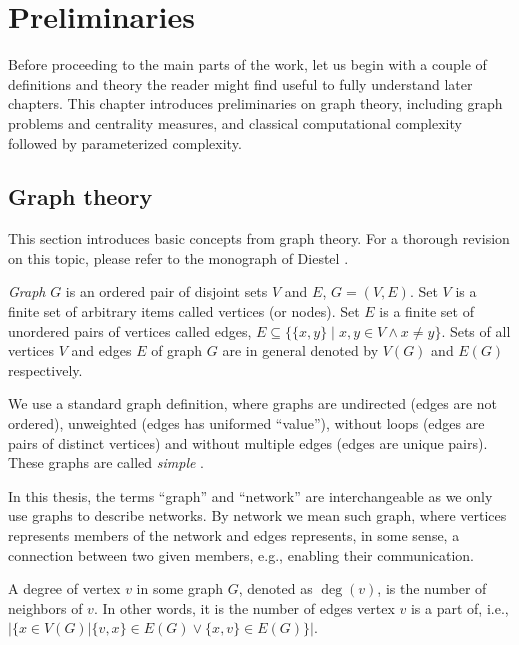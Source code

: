 \chapter{Preliminaries}

Before proceeding to the main parts of the work,
let us begin with a couple of definitions and theory the reader might find useful to fully understand later chapters.
This chapter introduces preliminaries on graph theory, including graph problems and centrality measures, and 
classical computational complexity followed by parameterized complexity.


\section{Graph theory}

This section introduces basic concepts from graph theory.
For a thorough revision on this topic, please refer to the monograph of Diestel \cite{Diestel2018}.

\begin{definition}[Graph]
    \emph{Graph} $G$ is an ordered pair of disjoint sets $V$ and $E$, $G=(V,E)$.
    Set $V$ is a finite set of arbitrary items called vertices (or nodes).
    Set $E$ is a finite set of unordered pairs of vertices called edges, $E \subseteq \{\{x,y\} \mid x,y \in V \wedge x \neq y\}$.
    Sets of all vertices $V$ and edges $E$ of graph $G$ are in general denoted by $V(G)$ and $E(G)$ respectively.
\end{definition}

We use a standard graph definition, where graphs are undirected (edges are not ordered),
unweighted (edges has uniformed ``value''), without loops (edges are pairs of distinct vertices) and
without multiple edges (edges are unique pairs).
These graphs are called \emph{simple} \cite[p.~29]{Diestel2018}.

In this thesis, the terms ``graph'' and ``network'' are interchangeable as we only use graphs to describe networks.
By network we mean such graph, where vertices represents members of the network 
and edges represents, in some sense, a connection between two given members, e.g., enabling their communication.

\begin{definition}
    A degree of vertex $v$ in some graph $G$, denoted as $\deg(v)$, is the number of neighbors of $v$.
    In other words, it is the number of edges vertex $v$ is a part of, i.e.,
    $\Big|\{x \in V(G) \vert \{v,x\} \in E(G) \vee \{x,v\} \in E(G)\}\Big|$.
\end{definition}

